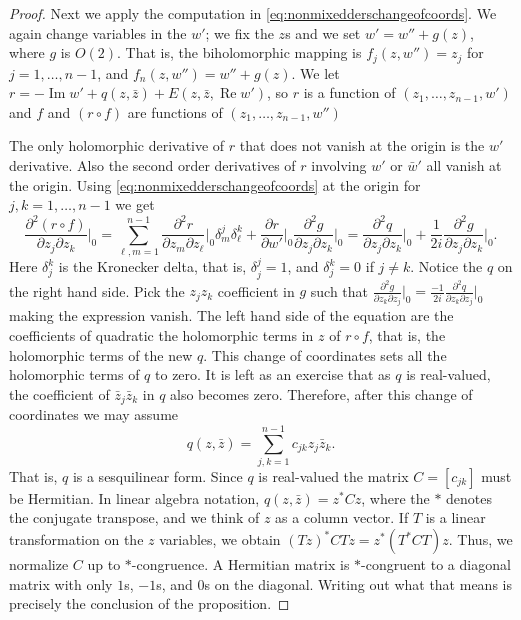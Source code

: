 \documentclass[12pt,openany]{book}
\renewcommand{\Re}{\operatorname{Re}}
\renewcommand{\Im}{\operatorname{Im}}
\theoremstyle{plain}
\theoremstyle{remark}
\theoremstyle{definition}
\theoremstyle{exercise}
\theoremstyle{example}
\begin{document}
\begin{proof}
Next we 
apply the computation in \eqref{eq:nonmixedderschangeofcoords}.
We again change variables in the $w'$; we fix the $z$s and we set
$w' = w'' + g(z)$, where $g$ is $O(2)$.  
That is, the biholomorphic mapping is
$f_j(z,w'') = z_j$ for $j=1,\ldots,n-1$, and $f_n(z,w'') = w'' +g(z)$.
We let $r = - \Im w' + q(z,\bar{z}) + E(z,\bar{z},\Re w')$, so
$r$ is a function of $(z_1,\ldots,z_{n-1},w')$ and
$f$ and $(r \circ f)$ are functions of $(z_1,\ldots,z_{n-1},w'')$

The only
holomorphic derivative of $r$ that does not vanish at the origin is the $w'$
derivative.  Also the second order derivatives of $r$ involving $w'$ or
$\bar{w}'$ all vanish at the origin.
Using
\eqref{eq:nonmixedderschangeofcoords} at the origin for
$j,k=1,\ldots,n-1$ we get
\begin{equation*}
\frac{\partial^2 (r \circ f)}{\partial z_j \partial z_k}
\Big|_0 = 
\sum_{\ell,m=1}^{n-1} \frac{\partial^2 r}{\partial z_m \partial z_\ell}
\Big|_0
\delta_{m}^j \delta_{\ell}^k
+
\frac{\partial r}{\partial w'} \Big|_0
\frac{\partial^2 g}{\partial z_j \partial z_k} \Big|_0
=
\frac{\partial^2 q}{\partial z_j \partial z_k} \Big|_0
+
\frac{1}{2i} 
\frac{\partial^2 g}{\partial z_j \partial z_k} \Big|_0 .
\end{equation*}
Here $\delta_{j}^k$ is the Kronecker delta, that is, $\delta_j^j = 1$,
and $\delta_j^k = 0$ if $j \not= k$.  Notice the $q$ on the right hand
side.
Pick the $z_j z_k$ coefficient in $g$
such that $\frac{\partial^2 g}{\partial z_k \partial z_j} \big|_0 =
\frac{-1}{2i} \frac{\partial^2 q}{\partial z_k \partial z_j} \big|_0$
making the expression vanish.
The left hand side of the equation are the coefficients of
quadratic the holomorphic terms in $z$ of $r \circ f$, that is, the
holomorphic terms of the new $q$.
This change of coordinates
sets all the holomorphic terms of $q$ to zero.
It is left as an exercise that as $q$ is real-valued,
the coefficient of $\bar{z}_j \bar{z}_k$ in $q$ also becomes zero.
Therefore, after this change of coordinates we may assume
\begin{equation*}
q(z,\bar{z}) = \sum_{j,k=1}^{n-1} c_{jk} z_j \bar{z}_k .
\end{equation*}
That is, $q$ is a sesquilinear form.  Since $q$ is real-valued the matrix
$C = [ c_{jk} ]$ must be Hermitian.  In linear algebra notation,
$q(z,\bar{z}) = z^*Cz$,
%
where the $*$ denotes the conjugate transpose,
and we think of $z$ as a column vector.
If $T$ is a linear transformation on the $z$ variables, we
obtain ${(Tz)}^*CTz = z^* ( T^*CT) z$.  Thus, we normalize $C$
up to $*$-congruence.  A Hermitian matrix
is $*$-congruent to a diagonal matrix with only $1$s, $-1$s, and $0$s on the
diagonal.  Writing out what that means is precisely the conclusion of the
proposition.
\end{proof}
\end{document}

